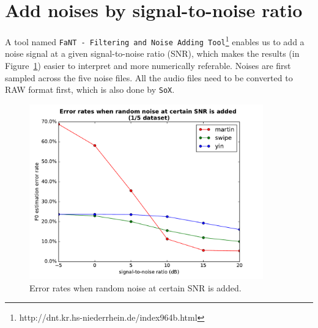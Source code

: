 \documentclass[11pt,a4paper]{report}
\begin{document}
\newpage

\section{Add noises by signal-to-noise ratio}

A tool named \texttt{FaNT - Filtering and Noise Adding Tool}\footnote{http://dnt.kr.hs-niederrhein.de/index964b.html} enables us to add a noise signal at a given signal-to-noise ratio (SNR), which makes the results (in Figure~\ref{fig:snr}) easier to interpret and more numerically referable.
Noises are first sampled across the five noise files.
All the audio files need to be converted to RAW format first, which is also done by \texttt{SoX}.

\begin{figure}[htbp]
  \centering
  \includegraphics[width=0.9\textwidth]{error_rates_vs_snrs.pdf}
  \caption{Error rates when random noise at certain SNR is added.} \label{fig:snr}
\end{figure}
\end{document}
